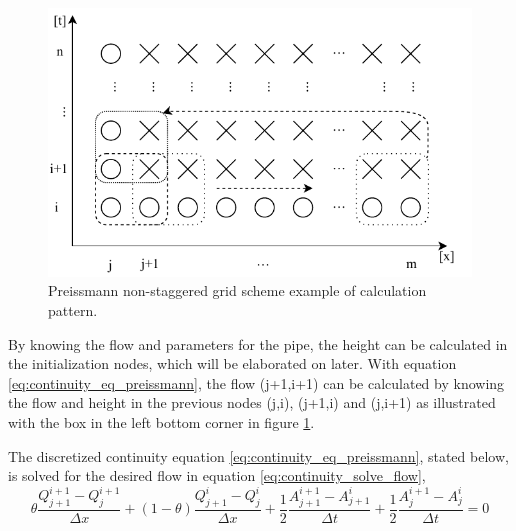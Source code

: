 \begin{figure}[H]
\centering
\includegraphics[width=.75\textwidth]{report/simulation/pictures/preissmann_scheme_iteration}
\caption{Preissmann non-staggered grid scheme example of calculation pattern.}
\label{fig:preissmann_grid_scheme_exampel}
\end{figure}
By knowing the flow and parameters for the pipe, the height can be calculated in the initialization nodes, which will be elaborated on later. With equation \ref{eq:continuity_eq_preissmann}, the flow (j+1,i+1) can be calculated by knowing the flow and height in the previous nodes (j,i), (j+1,i) and (j,i+1) as illustrated with the box in the left bottom corner in figure \ref{fig:preissmann_grid_scheme_exampel}.




The discretized continuity equation \ref{eq:continuity_eq_preissmann}, stated below, is solved for the desired flow in equation \ref{eq:continuity_solve_flow},
\begin{equation}
    \theta \frac{Q_{j+1}^{i+1}-Q_j^{i+1}}{\Delta x}+(1-\theta)\frac{Q_{j+1}^i - Q_j^i}{\Delta x}+
    \frac{1}{2}\frac{A_{j+1}^{i+1}-A_{j+1}^i}{\Delta t} + \frac{1}{2} \frac{A_{j}^{i+1} - A_j^i}{\Delta t} = 0
\end{equation}

